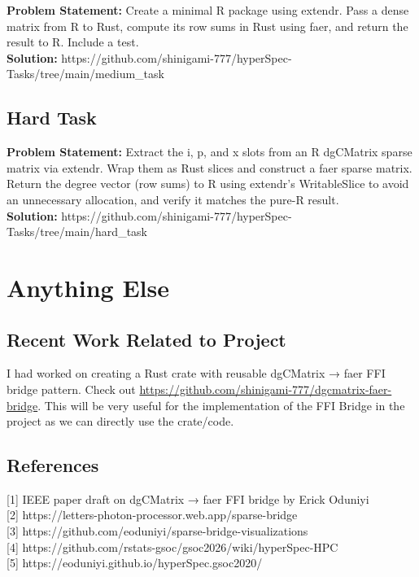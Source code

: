 \documentclass[11pt]{article}
\begin{document}
\textbf{Problem Statement:} Create a minimal R package using extendr.
Pass a dense matrix from R to Rust, compute its row sums in Rust using
faer, and return the result to R. Include a test.\\
\textbf{Solution:}
https://github.com/shinigami-777/hyperSpec-Tasks/tree/main/medium\_task

\hypertarget{hard-task}{%
\subsection{Hard Task}\label{hard-task}}

\textbf{Problem Statement:} Extract the i, p, and x slots from an R
dgCMatrix sparse matrix via extendr. Wrap them as Rust slices and
construct a faer sparse matrix. Return the degree vector (row sums) to R
using extendr's WritableSlice to avoid an unnecessary allocation, and
verify it matches the pure-R result.\\
\textbf{Solution:}
https://github.com/shinigami-777/hyperSpec-Tasks/tree/main/hard\_task

\hypertarget{anything-else}{%
\section{Anything Else}\label{anything-else}}

\hypertarget{recent-work-related-to-project}{%
\subsection{Recent Work Related to
Project}\label{recent-work-related-to-project}}

I had worked on creating a Rust crate with reusable dgCMatrix → faer FFI
bridge pattern. Check out
\url{https://github.com/shinigami-777/dgcmatrix-faer-bridge}. This will
be very useful for the implementation of the FFI Bridge in the project
as we can directly use the crate/code.

\hypertarget{references}{%
\subsection{References}\label{references}}

{[}1{]} IEEE paper draft on dgCMatrix → faer FFI bridge by Erick
Oduniyi\\
{[}2{]} https://letters-photon-processor.web.app/sparse-bridge\\
{[}3{]} https://github.com/eoduniyi/sparse-bridge-visualizations\\
{[}4{]} https://github.com/rstats-gsoc/gsoc2026/wiki/hyperSpec-HPC\\
{[}5{]} https://eoduniyi.github.io/hyperSpec.gsoc2020/


    
    
    
\end{document}
